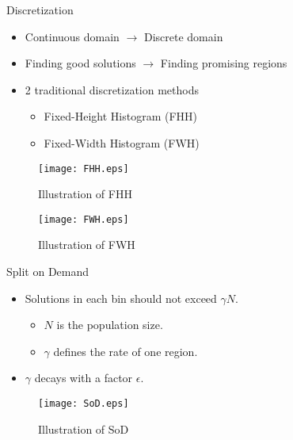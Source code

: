 \begin{frame}{Discretization} 
  \begin{itemize} 
    \item Continuous domain $\rightarrow$ Discrete domain 
    \item Finding good solutions $\rightarrow$ Finding promising
      regions
    \item 2 traditional discretization methods
      \begin{itemize}
        \item Fixed-Height Histogram (FHH)
        \item Fixed-Width Histogram (FWH)
      \end{itemize}
      \vspace*{2pt}
  \end{itemize}
  \begin{minipage}{.45\textwidth}
    \begin{figure}
      \centering
      \texttt{[image: FHH.eps]}
      \caption{Illustration of FHH}
    \end{figure}
  \end{minipage}
  \begin{minipage}{.45\textwidth}
    \begin{figure}
      \centering
      \texttt{[image: FWH.eps]}
      \caption{Illustration of FWH}
    \end{figure}
  \end{minipage}

\end{frame}

\begin{frame}{Split on Demand}
  \begin{itemize}
    \item Solutions in each bin should not exceed $\gamma N$.
      \begin{itemize}
        \item $N$ is the population size.
        \item $\gamma$ defines the rate of one region.
      \end{itemize}
    \item $\gamma$ decays with a factor $\epsilon$.
  \end{itemize}
  \hspace{-9cm}
  \vspace*{-0.5cm}
  \begin{figure}[h]
    \texttt{[image: SoD.eps]}
    \caption{Illustration of SoD}
  \end{figure}
\end{frame}

